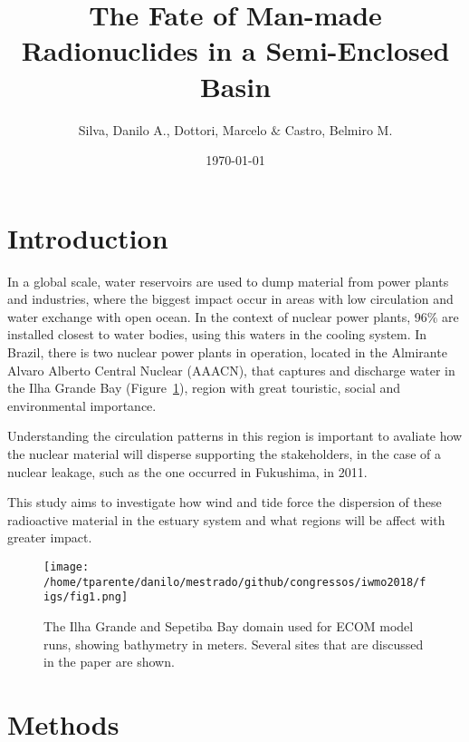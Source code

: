 \documentclass[final]{beamer}
\title
[24$^{o}$ Simpósio Internacional de Iniciação Científica da USP] %
{ %
The Fate of Man-made Radionuclides in a Semi-Enclosed Basin
}
\author{ Silva, Danilo A.\inst{1}, Dottori, Marcelo\inst{2} $\&$ Castro, Belmiro M.\inst{3} 
}
\institute[Instituto Oceanográfico - Universidade de São Paulo]
{
Instituto Oceanográfico da Universidade de São Paulo (IOUSP)\\ [0.2ex]
\inst{1} danilo2.silva@usp.br; \inst{2} mdottori@usp.br; \inst{3} bmcastro@usp.br
}
\date{\today}
\begin{document}
\begin{frame}
\begin{multicols}{2}

\section{Introduction}

In a global scale, water reservoirs are used to dump material from power plants and
industries, where the biggest impact occur in areas with low circulation and water
exchange with open ocean. In the context of nuclear power plants, 96$\%$ are installed
closest to water bodies, using this waters in the cooling system. In Brazil, there is
two nuclear power plants in operation, located in the Almirante Alvaro Alberto 
Central Nuclear (AAACN), that captures and discharge water in the Ilha Grande Bay
(Figure~\ref{fig:areaestudo}), region with great touristic, social and environmental importance.

Understanding the circulation patterns in this region is important to avaliate how the nuclear
material will disperse supporting the stakeholders, in the case of a nuclear leakage, such
as the one occurred in Fukushima, in 2011.

This study aims to investigate how wind and tide force the dispersion of these radioactive material in the
estuary system and what regions will be affect with greater impact.

\vspace{.1in}
\begin{figure}
\centering
\texttt{[image: /home/tparente/danilo/mestrado/github/congressos/iwmo2018/figs/fig1.png]}
\vspace{.1in}
\caption{The Ilha Grande and Sepetiba Bay domain used for ECOM model runs, showing bathymetry in meters. Several sites that are discussed in the paper are shown.}
\label{fig:areaestudo}
\end{figure}
\vspace{-.5in}
\section{Methods}


\end{multicols}
\end{frame}
\end{document}
